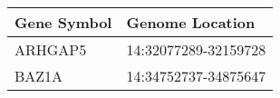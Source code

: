 \begin{tabular}{ll}
\toprule
Gene Symbol &      Genome Location \\
\midrule
    ARHGAP5 & 14:32077289-32159728 \\
      BAZ1A & 14:34752737-34875647 \\
\bottomrule
\end{tabular}
